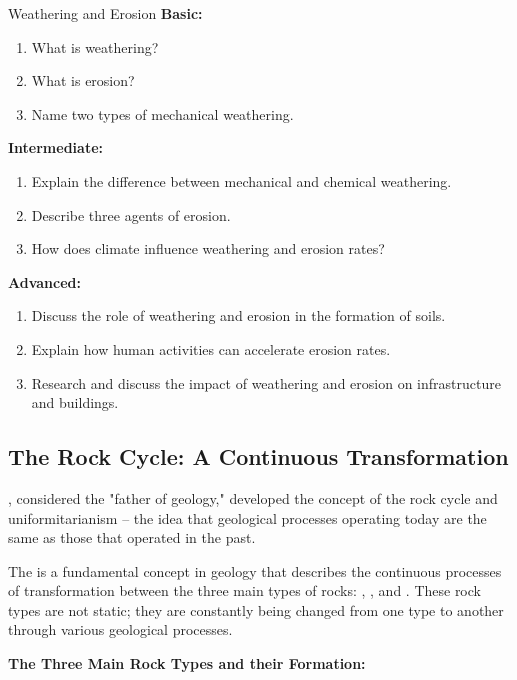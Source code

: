 \begin{tieredquestions}{Weathering and Erosion}
\textbf{Basic:}
\begin{enumerate}
    \item What is weathering?
    \item What is erosion?
    \item Name two types of mechanical weathering.
\end{enumerate}
\textbf{Intermediate:}
\begin{enumerate}
    \item Explain the difference between mechanical and chemical weathering.
    \item Describe three agents of erosion.
    \item How does climate influence weathering and erosion rates?
\end{enumerate}
\textbf{Advanced:}
\begin{enumerate}
    \item Discuss the role of weathering and erosion in the formation of soils.
    \item  Explain how human activities can accelerate erosion rates.
    \item  Research and discuss the impact of weathering and erosion on infrastructure and buildings.
\end{enumerate}
\end{tieredquestions}

\subsection{The Rock Cycle: A Continuous Transformation}

\begin{marginnote}
, considered the "father of geology," developed the concept of the rock cycle and uniformitarianism – the idea that geological processes operating today are the same as those that operated in the past.
\end{marginnote}

The  is a fundamental concept in geology that describes the continuous processes of transformation between the three main types of rocks: , , and .  These rock types are not static; they are constantly being changed from one type to another through various geological processes.

\textbf{The Three Main Rock Types and their Formation:}

